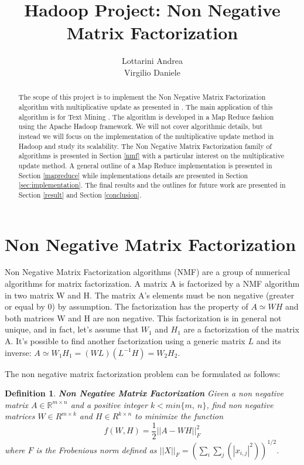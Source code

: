 \documentclass[a4paper,12pt]{article}
\title{Hadoop Project: Non Negative Matrix Factorization}
\author{Lottarini Andrea \\ Virgilio Daniele}
\newtheorem{mydef}{Definition}[section]
\begin{document}
\maketitle

\begin{abstract}

The scope of this project is to implement the Non Negative Matrix Factorization algorithm with multiplicative update as presented in \citep{liu2010}.
The main application of this algorithm is for Text Mining \cite{05abstractemail}.
The algorithm is developed in a Map Reduce fashion using the Apache Hadoop framework.
We will not cover algorithmic details, but instead we will focus on the implementation of the multiplicative update method in Hadoop and study its scalability.
The Non Negative Matrix Factorization family of algorithms is presented in Section \ref{nmf} with a particular interest on the   multiplicative update method. 
A general outline of a Map Reduce implementation is presented in Section \ref{mapreduce} while implementations details are presented in Section \ref{sec:implementation}.
The final results and the outlines for future work are presented in Section \ref{result} and Section \ref{conclusion}.

\end{abstract}

\section{Non Negative Matrix Factorization}
\label{nmf}

Non Negative Matrix Factorization algorithms (NMF) are a group of numerical algorithms for matrix factorization.
A matrix A is factorized by a NMF algorithm in two matrix W and H. 
The matrix A's elements must be non negative (greater or equal by 0) by assumption. 
The factorization has the property of $ A \simeq W H $ and both matrices W and H are non negative. 
This factorization is in general not unique, and in fact, let's assume that $W_1$ and $H_1$ are a factorization of the matrix A.
It's possible to find another factorization using a generic matrix $L$ and its inverse: $A \simeq W_1 H_1 = ( W L ) (L^{-1} H) = W_2 H_2  $. 

The non negative matrix factorization problem can be formulated as follows:
\begin{mydef} \textbf{Non Negative Matrix Factorization}
  Given a non negative matrix $A \in \mathbb{R}^{m×n}$ and a positive integer $k<min\{m,~n\} $, find non 	
  	negative matrices $W \in R^{m×k}$ and $H \in R^{k×n}$ to minimize the function  
  	$$ f ( W , H ) = \frac{1}{2} || A − W H ||_F^2$$ where $F$ is the Frobenious norm defined as
  	$|| X ||_F = ( \sum_i \sum_j( |x_{i,j}|^2 ) )^{1/2}$. 
  	\label{def:nmf}
\end{mydef}
\end{document}
